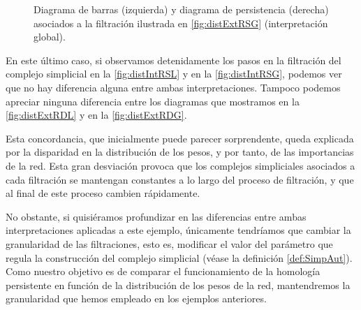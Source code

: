 \documentclass[12pt, a4paper, twoside]{book}
\numberwithin{equation}{section}
\theoremstyle{definition}
\newenvironment{ejem}
  {\pushQED{\qed}\renewcommand{\qedsymbol}{$\blacktriangleleft$}\ejemplo}
  {\popQED\endejemplo}
\theoremstyle{remark}
\theoremstyle{plain}
\begin{document}
\begin{ejem}
\begin{figure}[!htbp]
\begin{figure}[H]
			\end{figure}
		\endminipage
		\caption{Diagrama de barras (izquierda) y diagrama de 
		persistencia (derecha) asociados a la filtración ilustrada en 
		\ref{fig:distExtRSG} (interpretación global).}
		\label{fig:distExtRDG}
	\end{figure}

	En este último caso, si observamos detenidamente los pasos en la 
	filtración del complejo simplicial en la \autoref{fig:distIntRSL} y en 
	la \autoref{fig:distIntRSG}, podemos ver que no hay diferencia alguna 
	entre ambas interpretaciones. Tampoco podemos apreciar ninguna 
	diferencia entre los diagramas que mostramos en 
	la \autoref{fig:distExtRDL} y en la \autoref{fig:distExtRDG}.

	Esta concordancia, que inicialmente puede parecer sorprendente, 
	queda explicada por la disparidad en la distribución de los pesos, y 
	por tanto, de las importancias de la red. Esta gran desviación provoca 
	que los complejos simpliciales asociados a cada filtración se 
	mantengan constantes a lo largo del proceso de filtración, y que al 
	final de este proceso cambien rápidamente.

	No obstante, si quisiéramos profundizar en las diferencias entre ambas 
	interpretaciones aplicadas a este ejemplo, únicamente tendríamos que 
	cambiar la 
	granularidad de las filtraciones, esto es, modificar el valor del 
	parámetro que regula la construcción del complejo simplicial (véase la 
	definición \ref{def:SimpAut}). Como nuestro objetivo es de 
	comparar el funcionamiento de la homología persistente en función de 
	la distribución de los pesos de la red, mantendremos la granularidad 
	que hemos empleado en los ejemplos anteriores.
	\end{ejem}
\end{document}
